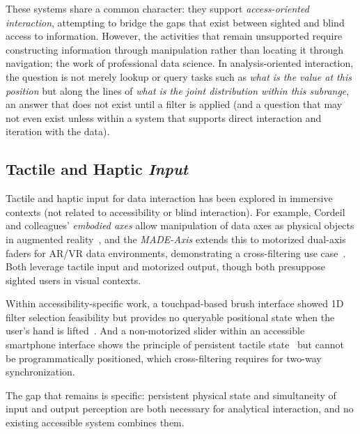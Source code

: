 \documentclass[12pt]{cmuthesis}
\begin{document}
These systems share a common character: they support \textit{access-oriented interaction}, attempting to bridge the gaps that exist between sighted and blind access to information. However, the activities that remain unsupported require constructing information through manipulation rather than locating it through navigation; the work of professional data science. In analysis-oriented interaction, the question is not merely lookup or query tasks such as \textit{what is the value at this position} but along the lines of \textit{what is the joint distribution within this subrange}, an answer that does not exist until a filter is applied (and a question that may not even exist unless within a system that supports direct interaction and iteration with the data).

\subsection{Tactile and Haptic \textit{Input}} 


Tactile and haptic input for data interaction has been explored in immersive contexts (not related to accessibility or blind interaction). For example, Cordeil and colleagues' \textit{embodied axes} allow manipulation of data axes as physical objects in augmented reality~\cite{Cordeil2020}, and the \textit{MADE-Axis} extends this to motorized dual-axis faders for AR/VR data environments, demonstrating a cross-filtering use case~\cite{Smiley2021}. Both leverage tactile input and motorized output, though both presuppose sighted users in visual contexts.

Within accessibility-specific work, a touchpad-based brush interface showed 1D filter selection feasibility but provides no queryable positional state when the user's hand is lifted~\cite{Sharif2024}. And a non-motorized slider within an accessible smartphone interface shows the principle of persistent tactile state~\cite{Zhang2018} but cannot be programmatically positioned, which cross-filtering requires for two-way synchronization.

The gap that remains is specific: persistent physical state and simultaneity of input and output perception are both necessary for analytical interaction, and no existing accessible system combines them.
\end{document}
